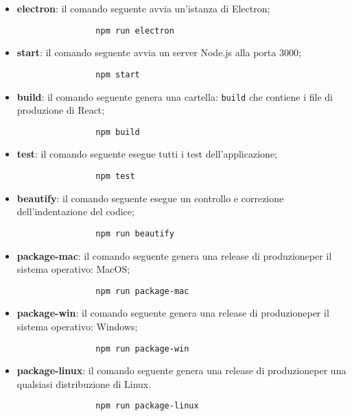 \begin{itemize}
        \begin{itemize}
            \item \textbf{electron}: il comando seguente avvia un'istanza di Electron;
            \begin{verbatim}
            	npm run electron
            \end{verbatim}
            \item \textbf{start}: il comando seguente avvia un server Node.js alla porta 3000;
            \begin{verbatim}
	            npm start
            \end{verbatim}
            \item \textbf{build}: il comando seguente genera una cartella: \verb|build| che contiene i file di produzione di React;
            \begin{verbatim}
            	npm build
            \end{verbatim}
            \item \textbf{test}: il comando seguente esegue tutti i test dell'applicazione;\\
            \begin{verbatim}
            	npm test
            \end{verbatim}
            \item \textbf{beautify}: il comando seguente esegue un controllo e correzione dell'indentazione del codice;\\
            \begin{verbatim}
            	npm run beautify
            \end{verbatim}
            \item \textbf{package-mac}: il comando seguente genera una release di produzione\glosp per il sistema operativo: MacOS;
            \begin{verbatim}
            	npm run package-mac
            \end{verbatim}
            \item \textbf{package-win}: il comando seguente genera una release di produzione\glosp per il sistema operativo: Windows;
            \begin{verbatim}
            	npm run package-win
            \end{verbatim}
            \item \textbf{package-linux}: il comando seguente genera una release di produzione\glosp per una qualsiasi distribuzione di Linux.
            \begin{verbatim}
            	npm run package-linux
            \end{verbatim}
        \end{itemize}
\end{itemize}
